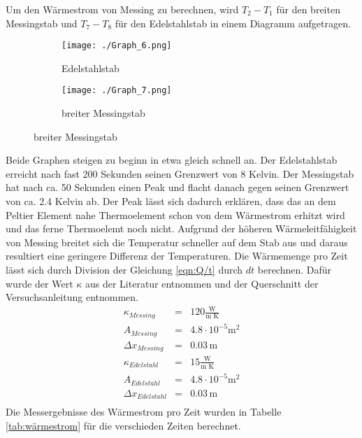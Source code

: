 Um den Wärmestrom von Messing zu berechnen, wird  $T_2 - T_1$ für den breiten Messingstab und $T_7 - T_8$ für den Edelstahlstab in einem Diagramm aufgetragen.\ 
\begin{figure}
	\centering
	\caption{Temperaturdifferenz}
	\begin{subfigure}{0.48\textwidth}
		\centering
		\texttt{[image: ./Graph\_6.png]}
		\caption{Edelstahlstab}
	\end{subfigure}
	\begin{subfigure}{0.48\textwidth}
		\centering
                \texttt{[image: ./Graph\_7.png]}
                \caption{breiter Messingstab}
        \end{subfigure}
\end{figure}
Beide Graphen steigen zu beginn in etwa gleich schnell an. Der Edelstahlstab erreicht nach fast 200 Sekunden seinen Grenzwert von 8 Kelvin. Der Messingstab hat nach ca. 50 Sekunden einen Peak und flacht danach gegen seinen Grenzwert von ca. 2.4 Kelvin ab. Der Peak lässt sich dadurch erklären, dass das an dem Peltier Element nahe Thermoelement schon von dem Wärmestrom erhitzt wird und das ferne Thermoelemt noch nicht. Aufgrund der höheren Wärmeleitfähigkeit von Messing breitet sich die Temperatur schneller auf dem Stab aus und daraus resultiert eine geringere Differenz der Temperaturen. 
Die Wärmemenge pro Zeit lässt sich durch Division der Gleichung \ref{eqn:Q/t} durch $dt$ berechnen. Dafür wurde der Wert $\kappa$ aus der Literatur entnommen und der Querschnitt der Versuchsanleitung entnommen.
\begin{eqnarray*} 
		 \kappa_{Messing} 	& =& 120 \frac{\text{W}}{\text{m K}}  		\\
		 A_{Messing} 		& =& 4.8 \cdot 10^{-5} \text{m}^2		\\
		 \Delta x_{Messing}	& =& 0.03 \, \text{m}				\\
		 \kappa_{Edelstahl}	& =& 15\frac{\text{W}}{\text{m K}}      	\\
                 A_{Edelstahl}          & =& 4.8 \cdot 10^{-5}\text{m}^2           	\\
                 \Delta x_{Edelstahl}   & =& 0.03 \, \text{m}           		\\
\end{eqnarray*}
Die Messergebnisse des Wärmestrom pro Zeit wurden in Tabelle \ref{tab:wärmestrom} für die verschieden Zeiten berechnet.
